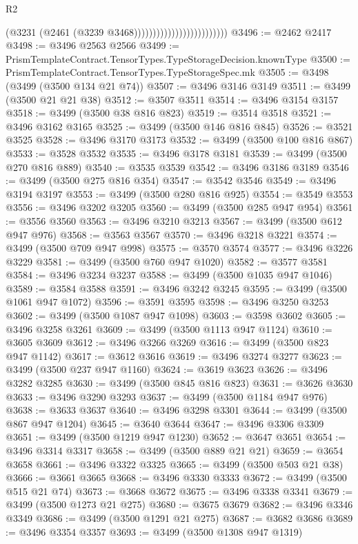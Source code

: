 \begin{lexlean}{R2}
\begin{coremodule}
                                                (@3231 (@2461 (@3239 @3468)))))))))))))))))))))))))
@3496 := @2462 @2417
@3498 := @3496 @2563 @2566
@3499 := PrismTemplateContract.TensorTypes.TypeStorageDecision.knownType
@3500 := PrismTemplateContract.TensorTypes.TypeStorageSpec.mk
@3505 := @3498 (@3499 (@3500 @134 @21 @74))
@3507 := @3496 @3146 @3149
@3511 := @3499 (@3500 @21 @21 @38)
@3512 := @3507 @3511
@3514 := @3496 @3154 @3157
@3518 := @3499 (@3500 @38 @816 @823)
@3519 := @3514 @3518
@3521 := @3496 @3162 @3165
@3525 := @3499 (@3500 @146 @816 @845)
@3526 := @3521 @3525
@3528 := @3496 @3170 @3173
@3532 := @3499 (@3500 @100 @816 @867)
@3533 := @3528 @3532
@3535 := @3496 @3178 @3181
@3539 := @3499 (@3500 @270 @816 @889)
@3540 := @3535 @3539
@3542 := @3496 @3186 @3189
@3546 := @3499 (@3500 @275 @816 @354)
@3547 := @3542 @3546
@3549 := @3496 @3194 @3197
@3553 := @3499 (@3500 @280 @816 @925)
@3554 := @3549 @3553
@3556 := @3496 @3202 @3205
@3560 := @3499 (@3500 @285 @947 @954)
@3561 := @3556 @3560
@3563 := @3496 @3210 @3213
@3567 := @3499 (@3500 @612 @947 @976)
@3568 := @3563 @3567
@3570 := @3496 @3218 @3221
@3574 := @3499 (@3500 @709 @947 @998)
@3575 := @3570 @3574
@3577 := @3496 @3226 @3229
@3581 := @3499 (@3500 @760 @947 @1020)
@3582 := @3577 @3581
@3584 := @3496 @3234 @3237
@3588 := @3499 (@3500 @1035 @947 @1046)
@3589 := @3584 @3588
@3591 := @3496 @3242 @3245
@3595 := @3499 (@3500 @1061 @947 @1072)
@3596 := @3591 @3595
@3598 := @3496 @3250 @3253
@3602 := @3499 (@3500 @1087 @947 @1098)
@3603 := @3598 @3602
@3605 := @3496 @3258 @3261
@3609 := @3499 (@3500 @1113 @947 @1124)
@3610 := @3605 @3609
@3612 := @3496 @3266 @3269
@3616 := @3499 (@3500 @823 @947 @1142)
@3617 := @3612 @3616
@3619 := @3496 @3274 @3277
@3623 := @3499 (@3500 @237 @947 @1160)
@3624 := @3619 @3623
@3626 := @3496 @3282 @3285
@3630 := @3499 (@3500 @845 @816 @823)
@3631 := @3626 @3630
@3633 := @3496 @3290 @3293
@3637 := @3499 (@3500 @1184 @947 @976)
@3638 := @3633 @3637
@3640 := @3496 @3298 @3301
@3644 := @3499 (@3500 @867 @947 @1204)
@3645 := @3640 @3644
@3647 := @3496 @3306 @3309
@3651 := @3499 (@3500 @1219 @947 @1230)
@3652 := @3647 @3651
@3654 := @3496 @3314 @3317
@3658 := @3499 (@3500 @889 @21 @21)
@3659 := @3654 @3658
@3661 := @3496 @3322 @3325
@3665 := @3499 (@3500 @503 @21 @38)
@3666 := @3661 @3665
@3668 := @3496 @3330 @3333
@3672 := @3499 (@3500 @515 @21 @74)
@3673 := @3668 @3672
@3675 := @3496 @3338 @3341
@3679 := @3499 (@3500 @1273 @21 @275)
@3680 := @3675 @3679
@3682 := @3496 @3346 @3349
@3686 := @3499 (@3500 @1291 @21 @275)
@3687 := @3682 @3686
@3689 := @3496 @3354 @3357
@3693 := @3499 (@3500 @1308 @947 @1319)

\end{coremodule}
\end{lexlean}
